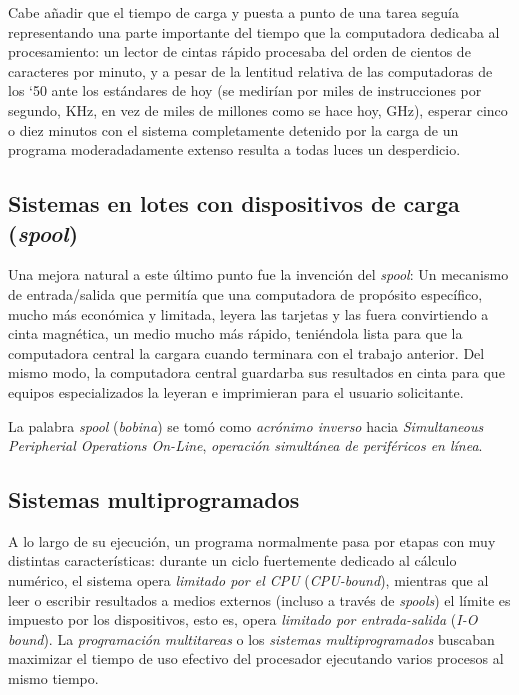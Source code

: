 \documentclass[11pt,fleqn]{book} %
\begin{document}
Cabe añadir que el tiempo de carga y puesta a punto de una tarea
seguía representando una parte importante del tiempo que la
computadora dedicaba al procesamiento: un lector de cintas rápido procesaba
del orden de cientos de caracteres por minuto, y a pesar de la
lentitud relativa de las computadoras de los `50 ante los estándares
de hoy (se medirían por miles de instrucciones por segundo, KHz, en
vez de miles de millones como se hace hoy, GHz), esperar cinco o
diez minutos con el sistema completamente detenido por la carga de un
programa moderadadamente extenso resulta a todas luces un desperdicio.
\subsection{Sistemas en lotes con dispositivos de carga (\emph{spool})}
\label{sec-1-3-2}


Una mejora natural a este último punto fue la invención del \emph{spool}:
Un mecanismo de entrada/salida que permitía que una computadora de
propósito específico, mucho más económica y limitada, leyera las
tarjetas y las fuera convirtiendo a cinta magnética, un medio mucho
más rápido, teniéndola lista para que la computadora central la
cargara cuando terminara con el trabajo anterior. Del mismo modo, la
computadora central guardarba sus resultados en cinta para que equipos
especializados la leyeran e imprimieran para el usuario solicitante.

La palabra \emph{spool} (\emph{bobina}) se tomó como \emph{acrónimo inverso} hacia
\emph{Simultaneous Peripherial Operations On-Line}, \emph{operación simultánea de periféricos en línea}.
\subsection{Sistemas multiprogramados}
\label{sec-1-3-3}
\label{INTRO_multiprogramados}


A lo largo de su ejecución, un programa normalmente pasa por etapas
con muy distintas características: durante un ciclo fuertemente
dedicado al cálculo numérico, el sistema opera \emph{limitado por el CPU}
(\emph{CPU-bound}), mientras que al leer o escribir resultados a medios
externos (incluso a través de \emph{spools}) el límite es impuesto por los
dispositivos, esto es, opera \emph{limitado por entrada-salida} (\emph{I-O bound}). La \emph{programación multitareas} o los \emph{sistemas multiprogramados} buscaban maximizar el tiempo de uso efectivo
del procesador ejecutando varios procesos al mismo tiempo.
\end{document}
